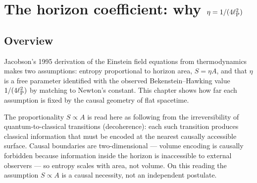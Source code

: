 
\chapter{The horizon coefficient: why $\eta=1/(4\ell_{\mathrm P}^2)$}\label{ch:bekenstein}

\section*{Overview}
Jacobson's 1995 derivation of the Einstein field equations from thermodynamics~\cite{Jacobson1995} makes two assumptions: entropy proportional
to horizon area, $S=\eta A$, and that $\eta$ is a free parameter identified with the observed Bekenstein--Hawking value $1/(4\ell_{\mathrm P}^2)$ by matching to
Newton's constant. This chapter shows how far each assumption is fixed by the causal geometry of flat spacetime.

The proportionality $S\propto A$ is read here as following from the irreversibility of quantum-to-classical transitions (decoherence): each such
transition produces classical information that must be encoded at the nearest causally accessible surface. Causal boundaries are two-dimensional
--- volume encoding is causally forbidden because information inside the horizon is inaccessible to external observers --- so entropy scales with
area, not volume. On this reading the assumption $S\propto A$ is a causal necessity, not an independent postulate. \interp

